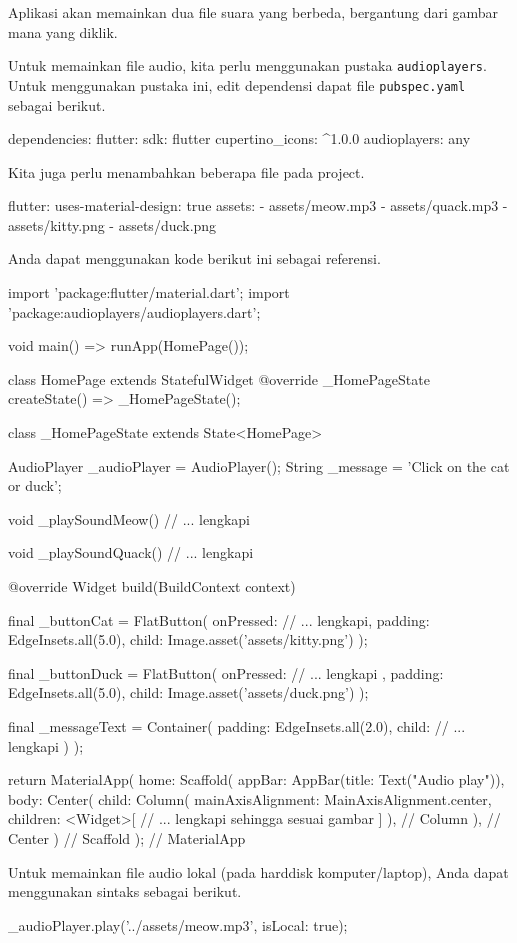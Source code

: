 \documentclass[a4paper,11pt]{article} %
\newcommand{\txtinline}[1]{\texttt{#1}}
\begin{document}
Aplikasi akan memainkan dua file suara yang berbeda, bergantung dari
gambar mana yang diklik.

Untuk memainkan file audio, kita perlu menggunakan pustaka \txtinline{audioplayers}.
Untuk menggunakan pustaka ini, edit dependensi dapat file \txtinline{pubspec.yaml}
sebagai berikut.
\begin{textcode}
dependencies:
  flutter:
    sdk: flutter
  cupertino_icons: ^1.0.0
  audioplayers: any
\end{textcode}

Kita juga perlu menambahkan beberapa file pada project.
\begin{textcode}
flutter:
  uses-material-design: true
  assets:
    - assets/meow.mp3
    - assets/quack.mp3
    - assets/kitty.png
    - assets/duck.png
\end{textcode}

Anda dapat menggunakan kode berikut ini sebagai referensi.
\begin{dartcode}
import 'package:flutter/material.dart';
import 'package:audioplayers/audioplayers.dart';
  
void main() => runApp(HomePage());
  
class HomePage extends StatefulWidget {
  @override
  _HomePageState createState() => _HomePageState();
}
  
class _HomePageState extends State<HomePage> {
  
  AudioPlayer _audioPlayer = AudioPlayer();
  String _message = 'Click on the cat or duck';
  
  void _playSoundMeow() {
    // ... lengkapi
  }
  
  void _playSoundQuack() {
    // ... lengkapi
  }
  
  @override
  Widget build(BuildContext context) {

    final _buttonCat = FlatButton(
      onPressed: // ... lengkapi,
      padding: EdgeInsets.all(5.0),
      child: Image.asset('assets/kitty.png')
    );

    final _buttonDuck = FlatButton(
      onPressed: // ... lengkapi ,
      padding: EdgeInsets.all(5.0),
      child: Image.asset('assets/duck.png')
    );
  
    final _messageText = Container(
      padding: EdgeInsets.all(2.0),
      child: // ... lengkapi
      )
    );
  
    return MaterialApp(
      home: Scaffold(
        appBar: AppBar(title: Text("Audio play")),
        body: Center(
          child: Column(
            mainAxisAlignment: MainAxisAlignment.center,
            children: <Widget>[
               // ... lengkapi sehingga sesuai gambar
            ]
          ), // Column
        ), // Center
      ) // Scaffold
    ); // MaterialApp
  }
}
\end{dartcode}


Untuk memainkan file audio lokal (pada harddisk komputer/laptop), Anda
dapat menggunakan sintaks sebagai berikut.
\begin{dartcode}
_audioPlayer.play('../assets/meow.mp3', isLocal: true);
\end{dartcode}





\end{document}
